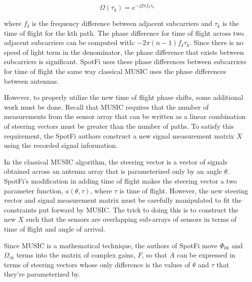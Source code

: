 \documentclass[12pt]{report}
\begin{document}
$$\Omega(\tau_{k}) = e^{-j 2 \pi f_{\delta} \tau_k }$$

where $f_{\delta}$ is the frequency difference between adjacent subcarriers and $\tau_{k}$ is the time of flight for the kth path. The phase difference for time of flight across two adjacent subcarriers can be computed with: $-2 \pi (n - 1) f_{\delta} \tau_k$. Since there is no speed of light term in the denominator,  the phase difference that exists between subcarriers is significant. SpotFi uses these phase differences between subcarriers for time of flight the same way classical MUSIC uses the phase differences between antennas. \par

However, to properly utilize the new time of flight phase shifts, some additional work must be done. Recall that MUSIC requires that the number of measurements from the sensor array that can be written as a linear combination of steering vectors must be greater than the number of paths. To satisfy this requirement, the SpotFi authors construct a new signal measurement matrix $X$ using the recorded signal information. \par

In the classical MUSIC algorithm, the steering vector is a vector of signals obtained across an antenna array that is parameterized only by an angle $\theta$. SpotFi's modification in adding time of flight makes the steering vector a two parameter function, $a(\theta, \tau)$, where $\tau$ is time of flight. However, the new steering vector and signal measurement matrix must be carefully manipulated to fit the constraints put forward by MUSIC. The trick to doing this is to construct the new $X$ such that the sensors are overlapping sub-arrays of sensors in terms of time of flight and angle of arrival. 


Since MUSIC is a mathematical technique, the authors of SpotFi move $\Phi_{\theta k}$ and $\Omega_{\tau k}$ terms into the matrix of complex gains, $F$, so that $A$ can be expressed in terms of steering vectors whose only difference is the values of $\theta$ and $\tau$ that they're parameterized by. 

\end{document}
